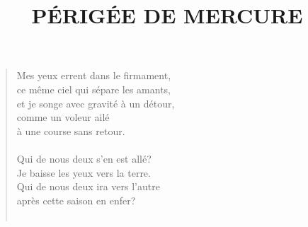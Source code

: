 \documentclass[twocolumn,11pt]{article}
\title{PÉRIGÉE DE MERCURE}
\author{}
\date{}
\begin{document}
\maketitle

\thispagestyle{empty}

\begin{verse}



Mes yeux errent dans le firmament,\\
ce même ciel qui sépare les amants,\\
et je songe avec gravité à un détour,\\
comme un voleur ailé\\
à une course sans retour.\\
\ \\

Qui de nous deux s'en est allé?\\
Je baisse les yeux vers la terre.\\
Qui de nous deux ira vers l'autre\\
après cette saison en enfer? \\
\ \\


\end{verse}
\end{document}
